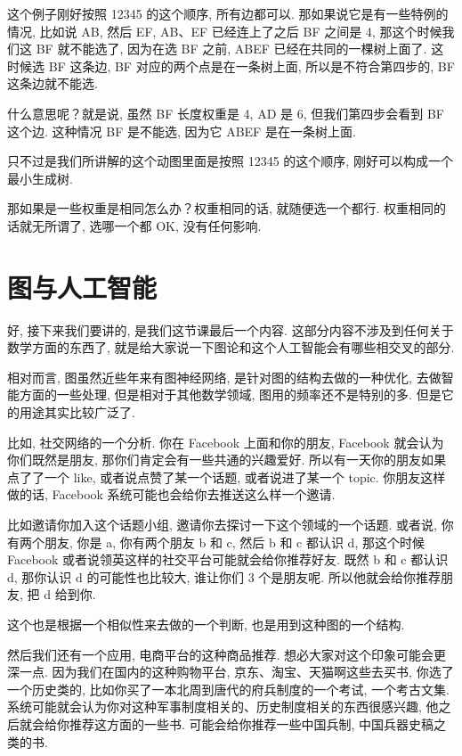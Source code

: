 这个例子刚好按照 12345 的这个顺序, 所有边都可以. 那如果说它是有一些特例的情况, 比如说 AB, 然后 EF, AB、EF 已经连上了之后 BF 之间是 4, 那这个时候我们这 BF 就不能选了, 因为在选 BF 之前, ABEF 已经在共同的一棵树上面了. 这时候选 BF 这条边, BF 对应的两个点是在一条树上面, 所以是不符合第四步的, BF 这条边就不能选. 

什么意思呢？就是说, 虽然 BF 长度权重是 4, AD 是 6, 但我们第四步会看到 BF 这个边. 这种情况 BF 是不能选, 因为它 ABEF 是在一条树上面. 

只不过是我们所讲解的这个动图里面是按照 12345 的这个顺序, 刚好可以构成一个最小生成树. 

那如果是一些权重是相同怎么办？权重相同的话, 就随便选一个都行. 权重相同的话就无所谓了, 选哪一个都 OK, 没有任何影响. 

\section{图与人工智能}

好, 接下来我们要讲的, 是我们这节课最后一个内容. 这部分内容不涉及到任何关于数学方面的东西了, 就是给大家说一下图论和这个人工智能会有哪些相交叉的部分. 

相对而言, 图虽然近些年来有图神经网络, 是针对图的结构去做的一种优化, 去做智能方面的一些处理, 但是相对于其他数学领域, 图用的频率还不是特别的多. 但是它的用途其实比较广泛了. 

比如, 社交网络的一个分析. 你在 Facebook 上面和你的朋友, Facebook 就会认为你们既然是朋友, 那你们肯定会有一些共通的兴趣爱好. 所以有一天你的朋友如果点了了一个 like, 或者说点赞了某一个话题, 或者说进了某一个 topic. 你朋友这样做的话, Facebook 系统可能也会给你去推送这么样一个邀请. 

比如邀请你加入这个话题小组, 邀请你去探讨一下这个领域的一个话题. 或者说, 你有两个朋友, 你是 a, 你有两个朋友 b 和 c, 然后 b 和 c 都认识 d, 那这个时候 Facebook 或者说领英这样的社交平台可能就会给你推荐好友. 既然 b 和 c 都认识 d, 那你认识 d 的可能性也比较大, 谁让你们 3 个是朋友呢. 所以他就会给你推荐朋友, 把 d 给到你. 

这个也是根据一个相似性来去做的一个判断, 也是用到这种图的一个结构. 

然后我们还有一个应用, 电商平台的这种商品推荐. 想必大家对这个印象可能会更深一点. 因为我们在国内的这种购物平台, 京东、淘宝、天猫啊这些去买书, 你选了一个历史类的, 比如你买了一本北周到唐代的府兵制度的一个考试, 一个考古文集. 系统可能就会认为你对这种军事制度相关的、历史制度相关的东西很感兴趣, 他之后就会给你推荐这方面的一些书. 可能会给你推荐一些中国兵制, 中国兵器史稿之类的书. 

